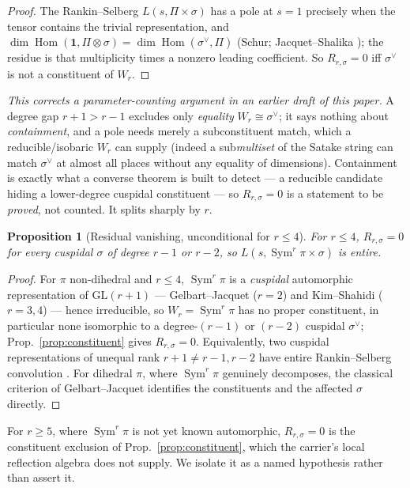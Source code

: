 \documentclass[11pt]{article}
\newtheorem{proposition}[theorem]{Proposition}
\theoremstyle{definition}
\newcommand{\Sym}{\operatorname{Sym}}
\begin{document}
\begin{proof}
The Rankin--Selberg $L(s,\Pi\times\sigma)$ has a pole at $s=1$ precisely when the tensor contains the
trivial representation, and $\dim\operatorname{Hom}(\mathbf 1,\Pi\otimes\sigma)=
\dim\operatorname{Hom}(\sigma^{\vee},\Pi)$ (Schur; Jacquet--Shalika \cite{JS}); the residue is that
multiplicity times a nonzero leading coefficient. So $R_{r,\sigma}=0$ iff $\sigma^{\vee}$ is not a
constituent of $W_r$.
\end{proof}

\noindent \emph{This corrects a parameter-counting argument in an earlier draft of this paper.} A degree gap
$r+1>r-1$ excludes only \emph{equality} $W_r\cong\sigma^{\vee}$; it says nothing about \emph{containment},
and a pole needs merely a subconstituent match, which a reducible/isobaric $W_r$ can supply (indeed a
sub\emph{multiset} of the Satake string can match $\sigma^{\vee}$ at almost all places without any equality
of dimensions). Containment is exactly what a converse theorem is built to detect --- a reducible candidate
hiding a lower-degree cuspidal constituent --- so $R_{r,\sigma}=0$ is a statement to be \emph{proved}, not
counted. It splits sharply by $r$.

\begin{proposition}[Residual vanishing, unconditional for $r\le4$]\label{prop:rle4}
For $r\le4$, $R_{r,\sigma}=0$ for every cuspidal $\sigma$ of degree $r-1$ or $r-2$, so
$L(s,\Sym^r\pi\times\sigma)$ is entire.
\end{proposition}
\begin{proof}
For $\pi$ non-dihedral and $r\le4$, $\Sym^r\pi$ is a \emph{cuspidal} automorphic representation of
$\mathrm{GL}(r+1)$ --- Gelbart--Jacquet \cite{GJ} ($r=2$) and Kim--Shahidi \cite{KimShahidi} ($r=3,4$) ---
hence irreducible, so $W_r=\Sym^r\pi$ has no proper constituent, in particular none isomorphic to a
degree-$(r-1)$ or $(r-2)$ cuspidal $\sigma^{\vee}$; Prop.~\ref{prop:constituent} gives $R_{r,\sigma}=0$.
Equivalently, two cuspidal representations of unequal rank $r+1\neq r-1,r-2$ have entire Rankin--Selberg
convolution \cite{JS}. For dihedral $\pi$, where $\Sym^r\pi$ genuinely decomposes, the classical criterion of
Gelbart--Jacquet identifies the constituents and the affected $\sigma$ directly.
\end{proof}

\noindent For $r\ge5$, where $\Sym^r\pi$ is not yet known automorphic, $R_{r,\sigma}=0$ is the constituent
exclusion of Prop.~\ref{prop:constituent}, which the carrier's local reflection algebra does not supply. We
isolate it as a named hypothesis rather than assert it.
\end{document}
